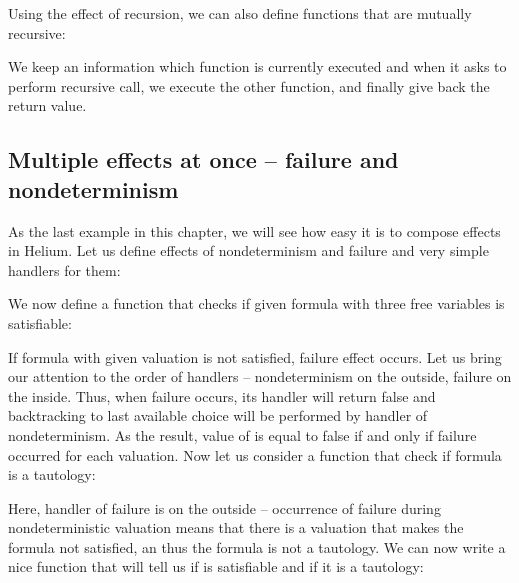 Using the effect of recursion, we can also define functions that are mutually recursive:



We keep an information which function is currently executed and when it asks to perform recursive call, we execute the other function, and finally give back the return value.

% 
%

\subsection{Multiple effects at once -- failure and nondeterminism}

As the last example in this chapter, we will see how easy it is to compose effects in Helium. Let us define effects of nondeterminism and failure and very simple handlers for them:





We now define a function that checks if given formula with three free variables is satisfiable:



If formula with given valuation is not satisfied, failure effect occurs. Let us bring our attention to the order of handlers -- nondeterminism on the outside, failure on the inside. Thus, when failure occurs, its handler will return false and backtracking to last available choice will be performed by handler of nondeterminism. As the result, value of is equal to false if and only if failure occurred for each valuation. Now let us consider a function that check if formula is a tautology:



Here, handler of failure is on the outside -- occurrence of failure during nondeterministic valuation means that there is a valuation that makes the formula not satisfied, an thus the formula is not a tautology. We can now write a nice function that will tell us if  is satisfiable and if it is a tautology:

